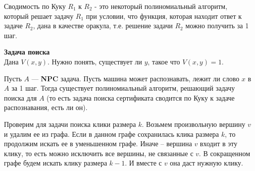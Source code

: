 \begin{definition}
Сводимость по Куку  $R_1$ к $R_2$ - это некоторый полиномиальный алгоритм, который решает задачу $R_1$ при условии, что функция, которая находит ответ к задаче $R_2$, дана в качестве оракула, т.е. решение задачи $R_2$ можно получить за 1 шаг.
\end{definition}

\textbf{Задача поиска}\\
Дана $V(x,y)$. Нужно понять, существует ли $y$, такое что $V(x,y) = 1$.
\begin{theorem}
Пусть $A$ --- \textbf{NPC} задача. Пусть машина может распознавать, лежит ли слово $x$ в $A$ за 1 шаг. Тогда существует полиномиальный алгоритм, решающий задачу поиска для $A$ (то есть задача поиска сертификата сводится по Куку к задаче распознавания, есть ли он).
\end{theorem}
\begin{example}
Проверим для задачи поиска клики размера $k$. Возьмем произвольную вершину $v$ и удалим ее из графа. Если в данном графе сохранилась клика размера $k$, то продолжим искать ее в уменьшенном графе. Иначе -- вершина $v$ входит в эту клику, то есть можно исключить все вершины, не связанные с $v$. В сокращенном графе будем искать клику размера $k-1$. И вместе с $v$ она даст нужную клику.
\end{example}
